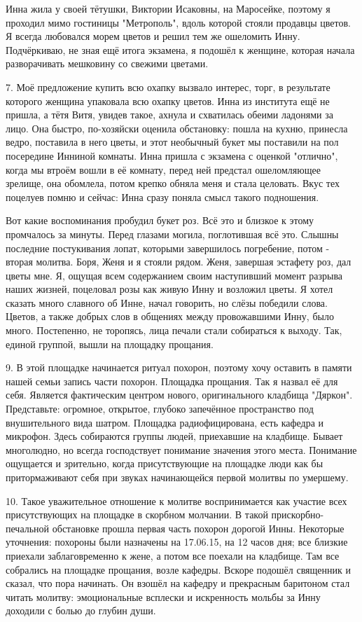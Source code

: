 Инна жила у своей тётушки, Виктории Исаковны, на Маросейке, поэтому я проходил мимо гостиницы "Метрополь", вдоль которой стояли продавцы цветов. Я всегда любовался морем цветов и решил тем же ошеломить Инну. Подчёркиваю, не зная ещё итога экзамена, я подошёл к женщине, которая начала разворачивать мешковину со свежими цветами.

7.
Моё предложение купить всю охапку вызвало интерес, торг, в результате которого женщина упаковала всю охапку цветов. Инна из института ещё не пришла, а тётя Витя, увидев такое, ахнула и схватилась обеими ладонями за лицо. Она быстро, по-хозяйски оценила обстановку: пошла на кухню, принесла ведро, поставила в него цветы, и этот необычный букет мы поставили на пол посередине Инниной комнаты. Инна пришла с экзамена с оценкой "отлично", когда мы втроём вошли в её комнату, перед ней предстал ошеломляющее зрелище, она обомлела, потом крепко обняла меня и стала целовать. Вкус тех поцелуев помню и сейчас: Инна сразу поняла смысл такого подношения.

Вот какие воспоминания пробудил букет роз. Всё это и близкое к этому промчалось за минуты. Перед глазами могила, поглотившая всё это. Слышны последние постукивания лопат, которыми завершилось погребение, потом - вторая молитва. Боря, Женя и я стояли рядом. Женя, завершая эстафету роз, дал цветы мне. Я, ощущая всем содержанием своим наступивший момент разрыва наших жизней, поцеловал розы как живую Инну и возложил цветы. Я хотел сказать много славного об Инне, начал говорить, но слёзы победили слова. Цветов, а также добрых слов в общениях между провожавшими Инну, было много. Постепенно, не торопясь, лица печали стали собираться к выходу. Так, единой группой, вышли на площадку прощания.

9.
В этой площадке начинается ритуал похорон, поэтому хочу оставить в памяти нашей семьи запись части похорон. Площадка прощания. Так я назвал её для себя. Является фактическим центром нового, оригинального кладбища "Дяркон". Представьте: огромное, открытое, глубоко запечённое пространство под внушительного вида шатром. Площадка радиофицирована, есть кафедра и микрофон. Здесь собираются группы людей, приехавшие на кладбище. Бывает многолюдно, но всегда господствует понимание значения этого места. Понимание ощущается и зрительно, когда присутствующие на площадке люди как бы притормаживают себя при звуках начинающейся первой молитвы по умершему.

10. Такое уважительное отношение к молитве воспринимается как участие всех присутствующих на площадке в скорбном молчании. В такой прискорбно-печальной обстановке прошла первая часть похорон дорогой Инны. Некоторые уточнения: похороны были назначены на 17.06.15, на 12 часов дня; все близкие приехали заблаговременно к жене, а потом все поехали на кладбище. Там все собрались на площадке прощания, возле кафедры. Вскоре подошёл священник и сказал, что пора начинать. Он взошёл на кафедру и прекрасным баритоном стал читать молитву: эмоциональные всплески и искренность мольбы за Инну доходили с болью до глубин души.

